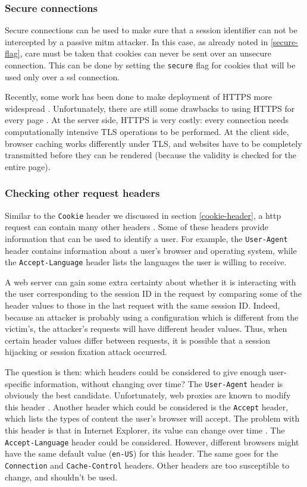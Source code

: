 \subsubsection{Secure connections}\label{ssl}

Secure connections can be used to make sure that a session identifier can not be intercepted by a passive \gls{mitm} attacker. In this case, as already noted in \ref{secure-flag}, care must be taken that cookies can never be sent over an unsecure connection. This can be done by setting the \texttt{secure} flag for cookies that will be used only over a \gls{ssl} connection.

Recently, some work has been done to make deployment of HTTPS more widespread \cite{Hodges2010,Jackson2008}. Unfortunately, there are still some drawbacks to using HTTPS for every page \cite{Adida2008}. At the server side, HTTPS is very costly: every connection needs computationally intensive TLS operations to be performed. At the client side, browser caching works differently under TLS, and websites have to be completely transmitted before they can be rendered (because the validity is checked for the entire page).

\subsubsection{Checking other request headers}

Similar to the \texttt{Cookie} header we discussed in section \ref{cookie-header}, a \gls{http} request can contain many other headers \cite{rfc2616}. Some of these headers provide information that can be used to identify a user. For example, the \texttt{User-Agent} header contains information about a user's browser and operating system, while the \texttt{Accept-Language} header lists the languages the user is willing to receive.

A web server can gain some extra certainty about whether it is interacting with the user corresponding to the session ID in the request by comparing some of the header values to those in the last request with the same session ID. Indeed, because an attacker is probably using a configuration which is different from the victim's, the attacker's requests will have different header values. Thus, when certain header values differ between requests, it is possible that a session hijacking or session fixation attack occurred.

The question is then: which headers could be considered to give enough user-specific information, without changing over time? The \texttt{User-Agent} header is obviously the best candidate. Unfortunately, web proxies are known to modify this header \cite{ShiflettHijacking}. Another header which could be considered is the \texttt{Accept} header, which lists the types of content the user's browser will accept. The problem with this header is that in Internet Explorer, its value can change over time \cite{ShiflettHijacking}. The \texttt{Accept-Language} header could be considered. However, different browsers might have the same default value (\texttt{en-US}) for this header. The same goes for the \texttt{Connection} and \texttt{Cache-Control} headers. Other headers are too susceptible to change, and shouldn't be used.

